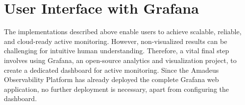 \section{User Interface with Grafana}

The implementations described above enable users to achieve scalable, reliable, and cloud-ready active monitoring. However, non-visualized results can be challenging for intuitive human understanding. Therefore, a vital final step involves using Grafana, an open-source analytics and visualization project, to create a dedicated dashboard for active monitoring. Since the Amadeus Observability Platform has already deployed the complete Grafana web application, no further deployment is necessary, apart from configuring the dashboard.